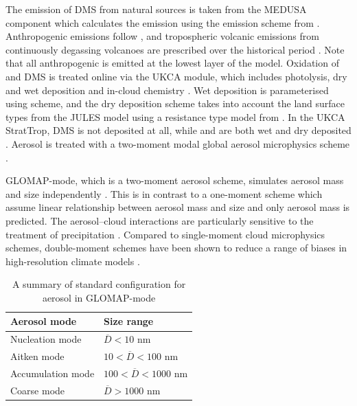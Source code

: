 The emission of DMS from natural sources is taken from the MEDUSA component which calculates the emission using the emission scheme from \citet{lissAirSeaGasExchange1986}. Anthropogenic  emissions follow \citet{hoeslyHistorical175020142018}, and tropospheric volcanic emissions from continuously degassing volcanoes are prescribed over the historical period \citep{andresTimeaveragedInventorySubaerial1998, dentenerEmissionsPrimaryAerosol2006}.  Note that all anthropogenic  is emitted at the lowest layer of the model. Oxidation of  and DMS is treated online via the UKCA module, which includes photolysis, dry and wet deposition and in-cloud chemistry \citep{mulcahyDescriptionEvaluationAerosol2020}. Wet deposition is parameterised using \citet{giannakopoulosValidationIntercomparisonWet1999} scheme, and the dry deposition scheme takes into account the land surface types from the JULES model using a resistance type model from \citet{weselyParameterizationSurfaceResistances1989}. In the UKCA StratTrop, DMS is not deposited at all, while  and  are both wet and dry deposited \citep{archibaldDescriptionEvaluationUKCA2020}. Aerosol is treated with a two-moment modal global aerosol microphysics scheme \citep[GLOMAP-mode;][]{mannDescriptionEvaluationGLOMAPmode2010}. 

GLOMAP-mode, which is a two-moment aerosol scheme, simulates aerosol mass and size independently \citep{mannDescriptionEvaluationGLOMAPmode2010}. This is in contrast to a one-moment scheme which assume linear relationship between aerosol mass and size and only aerosol mass is predicted. The aerosol–cloud interactions are particularly sensitive to the treatment of precipitation \citep{gettelmanAdvancedTwoMomentBulk2015}. Compared to single-moment cloud microphysics schemes, double-moment schemes have been shown to reduce a range of biases in high-resolution climate models \citep{seikiImprovementGlobalCloudSystemResolving2015}. 

\begin{table}
   \caption[Standard configuration for aerosol in GLOMAP-mode]{A summary of standard configuration for aerosol in GLOMAP-mode \citep{mannDescriptionEvaluationGLOMAPmode2010}}
   \label{tab:glomap}
   \centering
   \begin{tabular}{l l}
    \toprule
     Aerosol mode & Size range  \\
    \midrule
     Nucleation mode & $\overline{D} < 10$ nm \\ 
     Aitken mode & $10 < \overline{D} < 100$ nm \\
     Accumulation mode & $100 < \overline{D} < 1000$ nm\\
     Coarse mode & $ \overline{D} > 1000$ nm\\
     \bottomrule
   \end{tabular}
\end{table}


